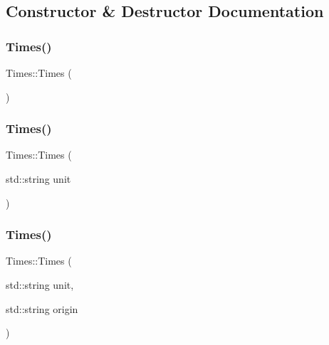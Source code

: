\subsection{Constructor \& Destructor Documentation}
\mbox{\label{class_times_a8ba246100f3c12f80abeb3beb93446f6}} 
\subsubsection{\texorpdfstring{Times()}{Times()}\hspace{0.1cm}{\footnotesize\ttfamily [1/3]}}
{\footnotesize\ttfamily Times\+::\+Times (\begin{DoxyParamCaption}{ }\end{DoxyParamCaption})}

\mbox{\label{class_times_a49de9639125c133a6b0e4351eaa422b5}} 
\subsubsection{\texorpdfstring{Times()}{Times()}\hspace{0.1cm}{\footnotesize\ttfamily [2/3]}}
{\footnotesize\ttfamily Times\+::\+Times (\begin{DoxyParamCaption}\item[{std\+::string}]{unit }\end{DoxyParamCaption})}

\mbox{\label{class_times_aec85fed5d7741b4ea2445874b3ecadfe}} 
\subsubsection{\texorpdfstring{Times()}{Times()}\hspace{0.1cm}{\footnotesize\ttfamily [3/3]}}
{\footnotesize\ttfamily Times\+::\+Times (\begin{DoxyParamCaption}\item[{std\+::string}]{unit,  }\item[{std\+::string}]{origin }\end{DoxyParamCaption})}

\mbox{\label{class_times_a7989831a284e9d10e3ae96ceb2349a3c}} 
